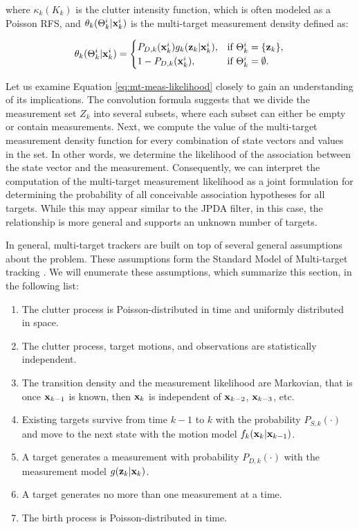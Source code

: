 \noindent where $\kappa_k(K_k)$ is the clutter intensity function, which is often modeled as a Poisson RFS, and $\theta_{k}(\Theta_{k}^i | \svecat{x}{k}{i})$ is the multi-target measurement density defined as:

\begin{equation}
    \theta_k(\Theta_{k}^i | \svecat{x}{k}{i}) = \begin{cases}
        P_{D,k}(\svecat{x}{k}{i})
            g_k(\vecat{z}{k} | \svecat{x}{k}{i}), & \text{if } \Theta_{k}^i = \{\vecat{z}{k}\}, \\
            1 - P_{D,k}(\svecat{x}{k}{i}), & \text{if } \Theta_{k}^i = \emptyset.
    \end{cases}
\end{equation}

Let us examine Equation \ref{eq:mt-meas-likelihood} closely to gain an understanding of its implications. The convolution formula suggests that we divide the measurement set $Z_k$ into several subsets, where each subset can either be empty or contain measurements. Next, we compute the value of the multi-target measurement density function for every combination of state vectors and values in the set. In other words, we determine the likelihood of the association between the state vector and the measurement. Consequently, we can interpret the computation of the multi-target measurement likelihood as a joint formulation for determining the probability of all conceivable association hypotheses for all targets. While this may appear similar to the JPDA filter, in this case, the relationship is more general and supports an unknown number of targets.

In general, multi-target trackers are built on top of several general assumptions about the problem. These assumptions form the Standard Model of Multi-target tracking \cite[311--313]{mahlerStatisticalMultisourcemultitargetInformation2007}. We will enumerate these assumptions, which summarize this section, in the following list:

\begin{enumerate}
    \item The clutter process is Poisson-distributed in time and uniformly distributed in space.
    \item The clutter process, target motions, and observations are statistically independent.
    \item The transition density and the measurement likelihood are Markovian, that is once $\vecat{x}{k-1}$ is known, then $\vecat{x}{k}$ is independent of $\vecat{x}{k-2}$, $\vecat{x}{k-3}$, etc.
    \item Existing targets survive from time $k-1$ to $k$ with the probability $P_{S,k}(\cdot)$ and move to the next state with the motion model $f_k(\vecat{x}{k} | \vecat{x}{k-1})$.
    \item A target generates a measurement with probability $P_{D,k}(\cdot)$ with the measurement model $g(\vecat{z}{k} | \vecat{x}{k})$.
    \item A target generates no more than one measurement at a time.
    \item The birth process is Poisson-distributed in time.
\end{enumerate}

